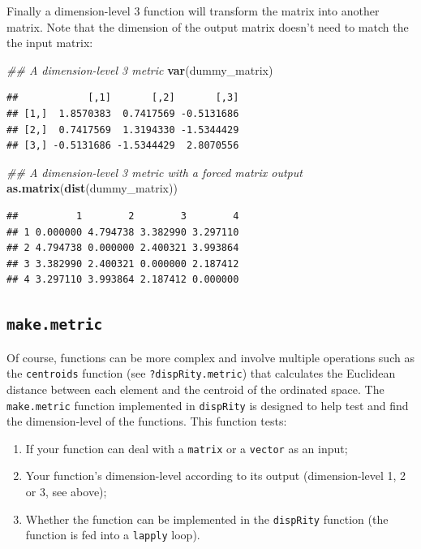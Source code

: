 \documentclass[]{book}
\newenvironment{Shaded}{\begin{snugshade}}{\end{snugshade}}
\newcommand{\CommentTok}[1]{\textcolor[rgb]{0.56,0.35,0.01}{\textit{#1}}}
\newcommand{\KeywordTok}[1]{\textcolor[rgb]{0.13,0.29,0.53}{\textbf{#1}}}
\newcommand{\NormalTok}[1]{#1}
\providecommand{\tightlist}{%
  \setlength{\itemsep}{0pt}\setlength{\parskip}{0pt}}
\begin{document}
Finally a dimension-level 3 function will transform the matrix into another matrix.
Note that the dimension of the output matrix doesn't need to match the the input matrix:

\begin{Shaded}
\begin{Highlighting}[]
\CommentTok{## A dimension-level 3 metric}
\KeywordTok{var}\NormalTok{(dummy_matrix)}
\end{Highlighting}
\end{Shaded}

\begin{verbatim}
##            [,1]       [,2]       [,3]
## [1,]  1.8570383  0.7417569 -0.5131686
## [2,]  0.7417569  1.3194330 -1.5344429
## [3,] -0.5131686 -1.5344429  2.8070556
\end{verbatim}

\begin{Shaded}
\begin{Highlighting}[]
\CommentTok{## A dimension-level 3 metric with a forced matrix output}
\KeywordTok{as.matrix}\NormalTok{(}\KeywordTok{dist}\NormalTok{(dummy_matrix))}
\end{Highlighting}
\end{Shaded}

\begin{verbatim}
##          1        2        3        4
## 1 0.000000 4.794738 3.382990 3.297110
## 2 4.794738 0.000000 2.400321 3.993864
## 3 3.382990 2.400321 0.000000 2.187412
## 4 3.297110 3.993864 2.187412 0.000000
\end{verbatim}

\hypertarget{make.metric}{%
\subsection{\texorpdfstring{\texttt{make.metric}}{make.metric}}\label{make.metric}}

Of course, functions can be more complex and involve multiple operations such as the \texttt{centroids} function (see \texttt{?dispRity.metric}) that calculates the Euclidean distance between each element and the centroid of the ordinated space.
The \texttt{make.metric} function implemented in \texttt{dispRity} is designed to help test and find the dimension-level of the functions.
This function tests:

\begin{enumerate}
\def\labelenumi{\arabic{enumi}.}
\tightlist
\item
  If your function can deal with a \texttt{matrix} or a \texttt{vector} as an input;
\item
  Your function's dimension-level according to its output (dimension-level 1, 2 or 3, see above);
\item
  Whether the function can be implemented in the \texttt{dispRity} function (the function is fed into a \texttt{lapply} loop).
\end{enumerate}
\end{document}
